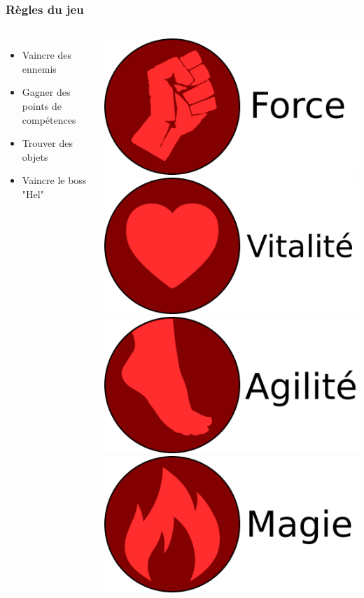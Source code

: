 \documentclass{beamer}
\begin{document}
\begin{frame}
\frametitle{Règles du jeu}
\begin{columns}
\begin{itemize}
	\item Vaincre des ennemis
	\item Gagner des points de compétences
	\item Trouver des objets
	\item Vaincre le boss "Hel"
\end{itemize}
\begin{center}
\includegraphics[width=.45\textwidth]{img/pres_strenght.png}\\
\includegraphics[width=.45\textwidth]{img/pres_vitality.png}\\
\includegraphics[width=.45\textwidth]{img/pres_agility.png}\\
\includegraphics[width=.45\textwidth]{img/pres_magic.png}
\end{center}
\end{columns}
\end{frame}
\end{document}
